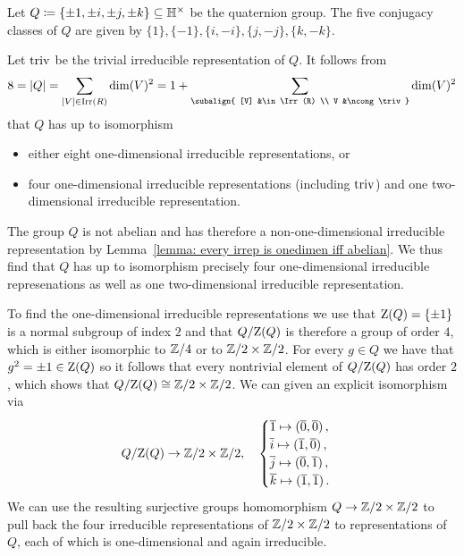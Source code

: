 \begin{example}
  Let $Q \coloneqq \{ \pm 1, \pm i, \pm j, \pm k \} \subseteq \mathbb{H}^\times$ be the quaternion group.
  The five conjugacy classes of $Q$ are given by $\{1\}, \{-1\}, \{i, -i\}, \{j, -j\}, \{k, -k\}$.
  
  Let $\operatorname{triv}$ be the trivial irreducible representation of $Q$.
  It follows from
  \[
      8
    = |Q|
    = \sum_{[V] \in \Irr(R)} \dim(V)^2
    = 1 + \sum_{\subalign{ [V] &\in \Irr(R) \\ V &\ncong \triv }} \dim(V)^2
  \]
  that $Q$ has up to isomorphism
  \begin{itemize}
    \item
      either eight one-dimensional irreducible representations, or
    \item
      four one-dimensional irreducible representations (including $\operatorname{triv}$) and one two-di\-men\-sion\-al irreducible  representation.
  \end{itemize}
  The group $Q$ is not abelian and has therefore a non-one-dimensional irreducible representation by Lemma~\ref{lemma: every irrep is onedimen iff abelian}.
  We thus find that $Q$ has up to isomorphism precisely four one-dimensional irreducible represenations as well as one two-dimensional irreducible representation.
  
  To find the one-dimensional irreducible representations we use that $\operatorname{Z}(Q) = \{\pm 1\}$ is a normal subgroup of index $2$ and that $Q/{\operatorname{Z}(Q)}$ is therefore a group of order $4$, which is either isomorphic to $\mathbb{Z}/4$ or to $\mathbb{Z}/2 \times \mathbb{Z}/2$.
  For every $g \in Q$ we have that $g^2 = \pm 1 \in \operatorname{Z}(Q)$ so it follows that every nontrivial element of $Q/{\operatorname{Z}(Q)}$ has order $2$, which shows that $Q/{\operatorname{Z}(Q)} \cong \mathbb{Z}/2 \times \mathbb{Z}/2$.
  We can given an explicit isomorphism via
  \[
            Q/{\operatorname{Z}(Q)}
    \to     \mathbb{Z}/2 \times \mathbb{Z}/2,
    \quad   \begin{cases}
              \overline{1} \mapsto (\overline{0}, \overline{0}) \,,  \\
              \overline{i} \mapsto (\overline{1}, \overline{0}) \,,  \\
              \overline{j} \mapsto (\overline{0}, \overline{1}) \,,  \\
              \overline{k} \mapsto (\overline{1}, \overline{1}) \,.
            \end{cases}
  \]
  We can use the resulting surjective groups homomorphism $Q \to \mathbb{Z}/2 \times \mathbb{Z}/2$ to pull back the four irreducible representations of $\mathbb{Z}/2 \times \mathbb{Z}/2$ to representations of $Q$, each of which is one-dimensional and again irreducible.
  

\end{example}

